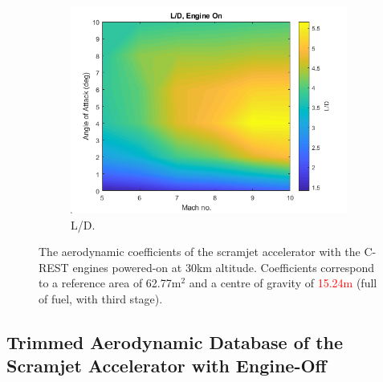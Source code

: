 \begin{figure}[ht]
\begin{subfigure}{.5\textwidth}
				\includegraphics[width=0.99\linewidth]{figures/3_vehicle_design/LD-EngineOn}
				\caption{L/D.}
				\label{fig:LD-EngineOn}
			\end{subfigure}
			\caption{The aerodynamic coefficients of the scramjet accelerator with the C-REST engines powered-on at 30km altitude. Coefficients correspond to a reference area of 62.77m$^2$ and a centre of gravity of \textcolor{red}{15.24m} (full of fuel, with third stage). }%
			\label{fig:EngineOnAero}
		\end{figure}
		
		

\subsection{Trimmed Aerodynamic Database of the Scramjet Accelerator with Engine-Off}\label{sec:trimmedongineoff}

